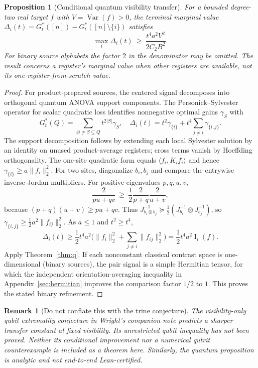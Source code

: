 \documentclass[11pt,letterpaper]{article}
\newtheorem{proposition}[theorem]{Proposition}
\newtheorem{remark}[theorem]{Remark}
\theoremstyle{definition}
\newcommand{\Var}{\operatorname{Var}}
\newcommand{\Inf}{\operatorname{I}}
\newcommand{\norm}[1]{\lVert #1\rVert}
\begin{document}
\begin{proposition}[Conditional quantum visibility transfer]\label{prop:qterminal}
For a bounded degree-two real target $f$ with $V=\Var(f)>0$,
the terminal marginal value
$\Delta_i(t)=G_t^*([n])-G_t^*([n]\setminus\{i\})$ satisfies
\begin{equation}\label{eq:quantumvis}
\boxed{\max_i\Delta_i(t)\ \ge\
\frac{t^4a^2V^2}{2C_2B^2}.}
\end{equation}
For binary source alphabets the factor $2$ in the denominator may be
omitted. The result concerns a register's marginal value \emph{when
other registers are available}, not its one-register-from-scratch value.
\end{proposition}
\begin{proof}
For product-prepared sources, the centered signal decomposes into
orthogonal quantum ANOVA support components. The Personick--Sylvester
operator for scalar quadratic loss identifies nonnegative optimal gains
$\gamma_S$ with
\[G_t^*(Q)=\sum_{\varnothing\ne S\subseteq Q}t^{2|S|}\gamma_S,
\quad \Delta_i(t)=t^2\gamma_{\{i\}}+
 t^4\sum_{j\ne i}\gamma_{\{i,j\}}.\]
The support decomposition follows by extending each local Sylvester
solution by an identity on unused product-average registers;
cross terms vanish by Hoeffding orthogonality. The one-site
quadratic form equals $\langle f_i,K_if_i\rangle$ and hence
$\gamma_{\{i\}}\ge a\norm{f_i}_2^2$.
For two sites, diagonalize $b_i,b_j$ and compare the entrywise inverse
Jordan multipliers. For positive eigenvalues $p,q,u,v$,
\[\frac{2}{pu+qv}\ \ge\
\frac12\frac{2}{p+q}\frac{2}{u+v},\]
because $(p+q)(u+v)\ge pu+qv$. Thus
$J_{b_i\otimes b_j}^{-1}\succeq\tfrac12
(J_{b_i}^{-1}\otimes J_{b_j}^{-1})$, so
$\gamma_{\{i,j\}}\ge\tfrac12a^2\norm{f_{ij}}_2^2$.
As $a\le1$ and $t^2\ge t^4$,
\[\Delta_i(t)\ge \frac12t^4a^2
\bigl(\norm{f_i}_2^2+\sum_{j\ne i}\norm{f_{ij}}_2^2\bigr)
=\frac12t^4a^2\Inf_i(f).\]
Apply Theorem~\ref{thm:q}. If each nonconstant classical contrast
space is one-dimensional (binary sources), the pair signal is a simple
Hermitian tensor, for which the independent orientation-averaging
inequality in Appendix~\ref{sec:hermitian} improves the comparison
factor $1/2$ to $1$. This proves the stated binary refinement.
\end{proof}
\begin{remark}[Do not conflate this with the trine conjecture]
The visibility-only qubit extremality conjecture in Wright's companion
note predicts a sharper transfer constant at fixed visibility. Its
unrestricted qubit inequality has not been proved. Neither its
conditional improvement nor a numerical qutrit counterexample is
included as a theorem here. Similarly, the quantum proposition is
analytic and not end-to-end Lean-certified.
\end{remark}
\end{document}
